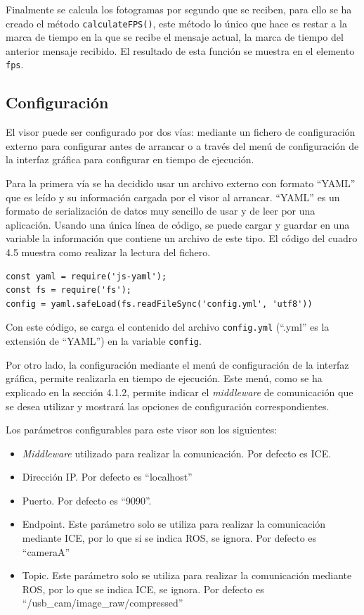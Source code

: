 Finalmente se calcula los fotogramas por segundo que se reciben, para ello se ha creado el método \texttt{calculateFPS()}, este método lo único que hace es restar a la marca de tiempo en la que se recibe el mensaje actual, la marca de tiempo del anterior mensaje recibido. El resultado de esta función se muestra en el elemento \texttt{fps}.

\subsection{Configuración}
El visor puede ser configurado por dos vías: mediante un fichero de configuración externo para configurar antes de arrancar o a través del menú de configuración de la interfaz gráfica para configurar en tiempo de ejecución.

Para la primera vía se ha decidido usar un archivo externo con formato ``YAML'' que es leído y su información cargada por el visor al arrancar. ``YAML'' es un formato de serialización de datos muy sencillo de usar y de leer por una aplicación. Usando una única línea de código, se puede cargar y guardar en una variable la información que contiene un archivo de este tipo. El código del cuadro 4.5 muestra como realizar la lectura del fichero.
\begin{lstlisting}[caption = Leer el fichero ``YAML'' con la configuración y guardar la información en una variable, label = cod.yaml]
const yaml = require('js-yaml');
const fs = require('fs');
config = yaml.safeLoad(fs.readFileSync('config.yml', 'utf8'))
\end{lstlisting}

Con este código, se carga el contenido del archivo \texttt{config.yml} (``.yml'' es la extensión de ``YAML'') en la variable \texttt{config}.

Por otro lado, la configuración mediante el menú de configuración de la interfaz gráfica, permite realizarla en tiempo de ejecución. Este menú, como se ha explicado en la sección 4.1.2, permite indicar el \textit{middleware} de comunicación que se desea utilizar y mostrará las opciones de configuración correspondientes.

Los parámetros configurables para este visor son los siguientes:
\begin{itemize}
\item \textit{Middleware} utilizado para realizar la comunicación. Por defecto es ICE.
\item Dirección IP. Por defecto es ``localhost''
\item Puerto. Por defecto es ``9090''.
\item Endpoint. Este parámetro solo se utiliza para realizar la comunicación mediante ICE, por lo que si se indica ROS, se ignora. Por defecto es ``cameraA''
\item Topic. Este parámetro solo se utiliza para realizar la comunicación mediante ROS, por lo que se indica ICE, se ignora. Por defecto es ``/usb\_cam/image\_raw/compressed''
\end{itemize}

